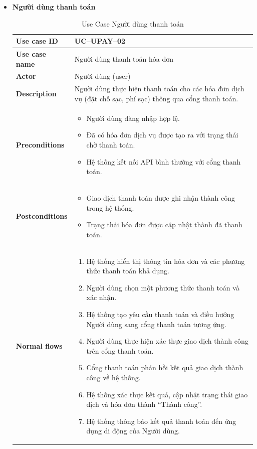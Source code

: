 \begin{itemize}
\item \textbf{Người dùng thanh toán}
\begin{longtable}{|m{}|m{}|}
          \caption{Use Case Người dùng thanh toán} \\
  \hline
  \textbf{Use case ID} & UC--UPAY--02 \\
  \hline
  \textbf{Use case name} & Người dùng thanh toán hóa đơn \\
  \hline
  \textbf{Actor} & Người dùng (user) \\
  \hline
  \textbf{Description} & Người dùng thực hiện thanh toán cho các hóa đơn dịch vụ (đặt chỗ sạc, phí sạc) thông qua cổng thanh toán. \\
  \hline
  \textbf{Preconditions} &
  \begin{itemize}
    \item Người dùng đăng nhập hợp lệ.
    \item Đã có hóa đơn dịch vụ được tạo ra với trạng thái chờ thanh toán.
    \item Hệ thống kết nối API bình thường với cổng thanh toán.
  \end{itemize}\\
  \hline
  \textbf{Postconditions} &
  \begin{itemize}
    \item Giao dịch thanh toán được ghi nhận thành công trong hệ thống.
    \item Trạng thái hóa đơn được cập nhật thành đã thanh toán.
  \end{itemize}\\
  \hline
  \textbf{Normal flows} &
  \begin{enumerate}[label=\arabic*.]
    \item Hệ thống hiển thị thông tin hóa đơn và các phương thức thanh toán khả dụng.
    \item Người dùng chọn một phương thức thanh toán và xác nhận.
    \item Hệ thống tạo yêu cầu thanh toán và điều hướng Người dùng sang cổng thanh toán tương ứng.
    \item Người dùng thực hiện xác thực giao dịch thành công trên cổng thanh toán.
    \item Cổng thanh toán phản hồi kết quả giao dịch thành công về hệ thống.
    \item Hệ thống xác thực kết quả, cập nhật trạng thái giao dịch và hóa đơn thành “Thành công”.
    \item Hệ thống thông báo kết quả thanh toán đến ứng dụng di động của Người dùng.

\end{enumerate}
\end{longtable}
\end{itemize}
